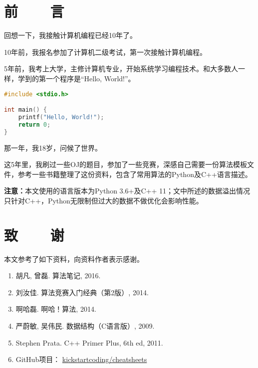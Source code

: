 \section*{前~~~~言}

回想一下，我接触计算机编程已经10年了。

10年前，我报名参加了计算机二级考试，第一次接触计算机编程。

5年前，我考上大学，主修计算机专业，开始系统学习编程技术。和大多数人一样，学到的第一个程序是“Hello, World!”。

\begin{lstlisting}[language=c]
#include <stdio.h>

int main() {
	printf("Hello, World!");
	return 0;
}
\end{lstlisting}

那一年，我18岁，问候了世界。

这5年里，我刷过一些OJ的题目，参加了一些竞赛，深感自己需要一份算法模板文件，参考一些书籍整理了这份资料，包含了常用算法的Python及C++语言描述。

\textbf{注意：}本文使用的语言版本为Python 3.6+及C++ 11；文中所述的数据溢出情况只针对C++，Python无限制但过大的数据不做优化会影响性能。

\section*{致~~~~谢}

本文参考了如下资料，向资料作者表示感谢。

\begin{enumerate}
	\item 胡凡, 曾磊. 算法笔记, 2016.
	\item 刘汝佳. 算法竞赛入门经典（第2版）, 2014.
	\item 啊哈磊. 啊哈！算法, 2014.
	\item 严蔚敏, 吴伟民. 数据结构（C语言版）, 2009.
	\item Stephen Prata. C++ Primer Plus, 6th ed, 2011.
	\item GitHub项目： \href{https://github.com/kickstartcoding/cheatsheets}{kickstartcoding/cheatsheets}
\end{enumerate}
